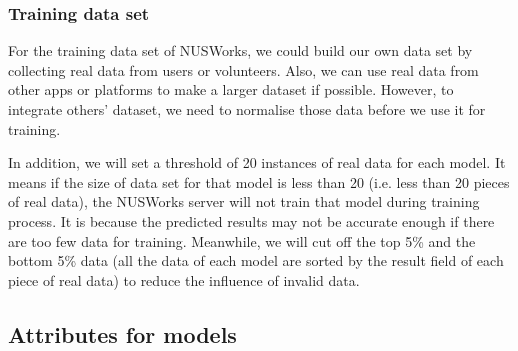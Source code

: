 \documentclass[fyp]{socreport}
\begin{document}
\subsubsection{Training data set}
For the training data set of NUSWorks, we could build our own data set by collecting real data from users or volunteers. Also, we can use real data from other apps or platforms to make a larger dataset if possible. However, to integrate others’ dataset, we need to normalise those data before we use it for training.

In addition, we will set a threshold of 20 instances of real data for each model. It means if the size of data set for that model is less than 20 (i.e. less than 20 pieces of real data), the NUSWorks server will not train that model during training process. It is because the predicted results may not be accurate enough if there are too few data for training. Meanwhile, we will cut off the top 5\% and the bottom 5\% data (all the data of each model are sorted by the result field of each piece of real data) to reduce the influence of invalid data.

\subsection{Attributes for models}
\end{document}
